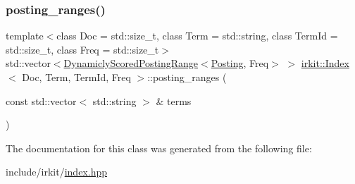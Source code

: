 \mbox{\label{classirkit_1_1Index_a95b2c99d94538638d93e990152e09cab}} 
\subsubsection{\texorpdfstring{posting\+\_\+ranges()}{posting\_ranges()}}
{\footnotesize\ttfamily template$<$class Doc  = std\+::size\+\_\+t, class Term  = std\+::string, class Term\+Id  = std\+::size\+\_\+t, class Freq  = std\+::size\+\_\+t$>$ \\
std\+::vector$<$\hyperlink{classirkit_1_1DynamiclyScoredPostingRange}{Dynamicly\+Scored\+Posting\+Range}$<$\hyperlink{structirkit_1_1__Posting}{Posting}, Freq$>$ $>$ \hyperlink{classirkit_1_1Index}{irkit\+::\+Index}$<$ Doc, Term, Term\+Id, Freq $>$\+::posting\+\_\+ranges (\begin{DoxyParamCaption}\item[{const std\+::vector$<$ std\+::string $>$ \&}]{terms }\end{DoxyParamCaption})\hspace{0.3cm}{\ttfamily [inline]}}



The documentation for this class was generated from the following file\+:\begin{DoxyCompactItemize}
\item 
include/irkit/\hyperlink{irkit_2index_8hpp}{index.\+hpp}\end{DoxyCompactItemize}
